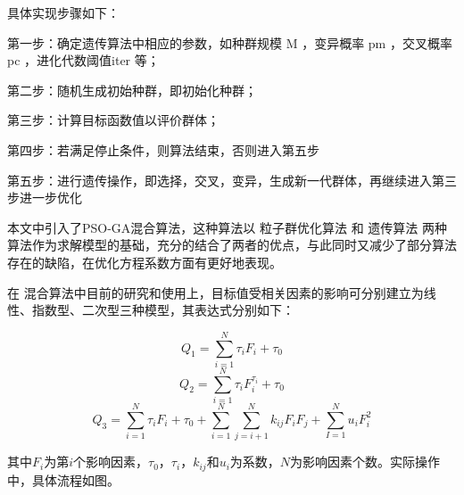 \documentclass[withoutpreface,bwprint]{cumcmthesis} %
\begin{document}
具体实现步骤如下：

第一步：确定遗传算法中相应的参数，如种群规模 M ，变异概率 pm ，交叉概率pc ，进化代数阈值iter 等；

第二步：随机生成初始种群，即初始化种群；

第三步：计算目标函数值以评价群体；

第四步：若满足停止条件，则算法结束，否则进入第五步

第五步：进行遗传操作，即选择，交叉，变异，生成新一代群体，再继续进入第三步进一步优化

本文中引入了PSO-GA混合算法，这种算法以 粒子群优化算法 和 遗传算法 两种算法作为求解模型的基础，充分的结合了两者的优点，与此同时又减少了部分算法存在的缺陷，在优化方程系数方面有更好地表现。

在 混合算法中目前的研究和使用上，目标值受相关因素的影响可分别建立为线性、指数型、二次型三种模型，其表达式分别如下：

$$Q_{1}=\sum^{N}_{i=1}\tau_{i} F_{i}+\tau_{0}$$
$$Q_{2}=\sum^{N}_{i=1}\tau_{i} F^{\tau_{i}}_{i}+\tau_{0}$$
$$Q_{3}=\sum^{N}_{i=1}\tau_{i}F_{i}+\tau_{0}+\sum^{N}_{i=1}\sum^{N}_{j=i+1}k_{ij}F_{i}F_{j}+\sum^{N}_{I=1}u_{i}F^2_{i}$$

其中$F_{i}$为第$i$个影响因素，$\tau_{0}$，$\tau_{i}$，$k_{ij}$和$u_{i}$为系数，$N$为影响因素个数。实际操作中，具体流程如图。
\end{document}
